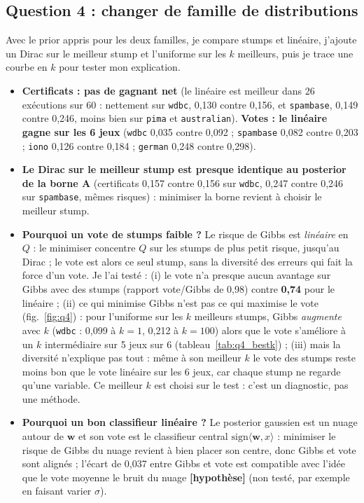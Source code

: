 \documentclass[11pt,a4paper]{article}
\newcommand{\hyp}{\textbf{[hypothèse]}}
\begin{document}
\subsection{Question 4 : changer de famille de distributions}
Avec le prior appris pour les deux familles, je compare stumps et linéaire, j'ajoute un Dirac sur le meilleur stump et l'uniforme sur les $k$ meilleurs, puis je trace une courbe en $k$ pour tester mon explication.
\begin{itemize}
\item \textbf{Certificats : pas de gagnant net} (le linéaire est meilleur dans 26 exécutions sur 60 : nettement sur \texttt{wdbc}, 0,130 contre 0,156, et \texttt{spambase}, 0,149 contre 0,246, moins bien sur \texttt{pima} et \texttt{australian}). \textbf{Votes : le linéaire gagne sur les 6 jeux} (\texttt{wdbc} 0,035 contre 0,092 ; \texttt{spambase} 0,082 contre 0,203 ; \texttt{iono} 0,126 contre 0,184 ; \texttt{german} 0,248 contre 0,298).
\item \textbf{Le Dirac sur le meilleur stump est presque identique au posterior de la borne A} (certificats 0,157 contre 0,156 sur \texttt{wdbc}, 0,247 contre 0,246 sur \texttt{spambase}, mêmes risques) : minimiser la borne revient à choisir le meilleur stump.
\item \textbf{Pourquoi un vote de stumps faible ?} Le risque de Gibbs est \emph{linéaire} en $Q$ : le minimiser concentre $Q$ sur les stumps de plus petit risque, jusqu'au Dirac ; le vote est alors ce seul stump, sans la diversité des erreurs qui fait la force d'un vote. Je l'ai testé : (i) le vote n'a presque aucun avantage sur Gibbs avec des stumps (rapport vote/Gibbs de 0,98) contre \textbf{0,74} pour le linéaire ; (ii) ce qui minimise Gibbs n'est pas ce qui maximise le vote (fig.~\ref{fig:q4}) : pour l'uniforme sur les $k$ meilleurs stumps, Gibbs \emph{augmente} avec $k$ (\texttt{wdbc} : 0,099 à $k=1$, 0,212 à $k=100$) alors que le vote s'améliore à un $k$ intermédiaire sur 5 jeux sur 6 (tableau~\ref{tab:q4_bestk}) ; (iii) mais la diversité n'explique pas tout : même à son meilleur $k$ le vote des stumps reste moins bon que le vote linéaire sur les 6 jeux, car chaque stump ne regarde qu'une variable. Ce \og meilleur $k$\fg{} est choisi sur le test : c'est un diagnostic, pas une méthode.
\item \textbf{Pourquoi un bon classifieur linéaire ?} Le posterior gaussien est un nuage autour de $\mathbf w$ et son vote est le classifieur central $\mathrm{sign}\langle\mathbf w,x\rangle$ : minimiser le risque de Gibbs du nuage revient à bien placer son centre, donc Gibbs et vote sont alignés ; l'écart de 0,037 entre Gibbs et vote est compatible avec l'idée que le vote moyenne le bruit du nuage \hyp{} (non testé, par exemple en faisant varier $\sigma$).
\end{itemize}
\end{document}
